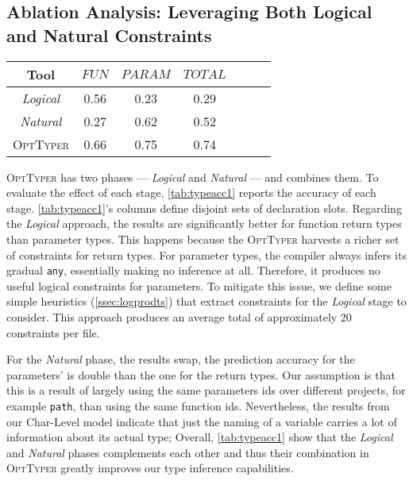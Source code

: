 \documentclass[acmsmall, review, anonymous]{acmart}\settopmatter{printfolios=true,printccs=false,printacmref=false}
\newcommand{\projectname}{\textsc{OptTyper}\xspace}
\begin{document}
\subsection{Ablation Analysis:  Leveraging Both Logical and Natural Constraints}\label{ssec:ablation}

\begin{table*}[t]
	\centering
	\caption{Ablation analysis of \projectname, the cells report accuracy; FUN refers to return types of functions and PARAM
	represents parameters.}
\label{tab:typeacc1}
	\begin{tabular}{ccccccc}
		\toprule
		Tool  & $\textit{FUN}$ & 
		$\textit{PARAM}$ & $\textit{TOTAL}$ \\
		
		\midrule
		\textit{Logical}      & 0.56                                   & 0.23                                 & 0.29                                  \\
		\textit{Natural}      & 0.27                                    & 0.62                                 & 0.52                                   \\
		\projectname  & 0.66         & 0.75         & 0.74\\
		\bottomrule
	\end{tabular}
\end{table*}
\projectname has two phases --- \textit{Logical} and \textit{Natural} --- and combines them.  To evaluate the effect of each stage, \cref{tab:typeacc1} reports the accuracy of each stage.
\cref{tab:typeacc1}'s columns define disjoint sets of declaration slots.
Regarding the \textit{Logical} approach, the results are significantly better for function return types
than parameter types.
This happens because the \projectname harvests a richer set of constraints for return types.
For parameter types, the compiler always 
infers its gradual \texttt{\small{any}}, essentially making no inference at all. Therefore, it produces no useful logical constraints for parameters.
To mitigate this issue, we define some simple heuristics (\cref{ssec:logprodts}) that extract constraints for the \textit{Logical} stage to consider. This approach produces an average total of approximately 20 constraints per file. 

For the \textit{Natural} phase, the results swap, the prediction accuracy for the parameters' is double than the one for the return types. Our assumption is that
this is a result of largely using the same parameters ids over different projects, for example \lstinline{path}, than using the same function ids. Nevertheless, the results from our Char-Level model indicate that just the naming of a variable carries a
lot of information about its actual type;   
Overall, \cref{tab:typeacc1} show that the \textit{Logical} and \textit{Natural} phases complements each other and thus their combination in \projectname greatly improves our type inference capabilities.
\end{document}
